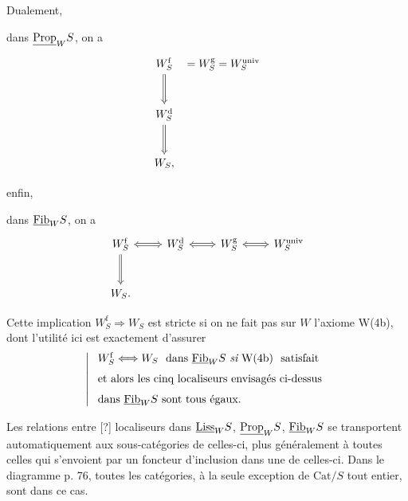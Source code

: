 Dualement,

 dans $\underline{\mathrm{Prop}}_W S$, on a
\[
\begin{tikzcd}[row sep=large, column sep=0pt]
W_S^{\mathrm{f}} \arrow[d, Rightarrow] & {} = W_S^{\mathrm{g}} = W_S^{\mathrm{univ}} \\
W_S^{\mathrm{d}} \arrow[d, Rightarrow] & \\
W_S, &
\end{tikzcd}
\]


enfin,

 dans $\underline{\mathrm{Fib}}_W S$, on a
\[
\begin{tikzcd}[row sep=large]
W_S^{\mathrm{f}} \arrow[r, Leftrightarrow] \arrow[d, Rightarrow] & W_S^{\mathrm{d}} \arrow[r, Leftrightarrow] & W_S^{\mathrm{g}} \arrow[r, Leftrightarrow] & W_S^{\mathrm{univ}} \\
W_S. & & &
\end{tikzcd}
\]

Cette implication $W_S^{\mathrm{f}} \Longrightarrow W_S$ est stricte si on ne fait pas sur $W$ l'axiome W(4b), dont l'utilité ici est exactement d'assurer
\[
\left|\;
\begin{array}{l}
W_S^{\mathrm{f}} \Longleftrightarrow W_S \ \text{ dans } \ul{Fib}_W S \ \textit{si}\ \mathrm{W}(4\mathrm{b})\ \ \text{satisfait}\\[1.5ex]
\text{et alors les cinq localiseurs envisagés ci-dessus}\\[1.5ex]
\text{dans } \ul{Fib}_W S \text{ sont tous égaux.}
\end{array}
\right.
\]

Les relations entre [?] localiseurs dans $\underline{\mathrm{Liss}}_W S$, $\underline{\mathrm{Prop}}_W S$, $\underline{\mathrm{Fib}}_W S$ se transportent automatiquement aux sous-catégories de celles-ci, plus généralement à toutes celles qui s'envoient
par un foncteur d'inclusion dans une de celles-ci. Dans le diagramme p. 76, toutes les catégories, à la seule exception de $\mathrm{Cat}/S$ tout entier, sont dans ce cas.

